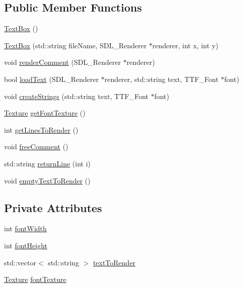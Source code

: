 \subsection*{Public Member Functions}
\begin{DoxyCompactItemize}
\item 
\hyperlink{class_text_box_a25b67e5ff6788c60b8aef3f3540879d0}{Text\+Box} ()
\item 
\hyperlink{class_text_box_a7e80f260cc97085b70e838f0f4250697}{Text\+Box} (std\+::string file\+Name, S\+D\+L\+\_\+\+Renderer $\ast$renderer, int x, int y)
\item 
void \hyperlink{class_text_box_a8746fe595a510ea6c3dc9908b448802c}{render\+Comment} (S\+D\+L\+\_\+\+Renderer $\ast$renderer)
\item 
bool \hyperlink{class_text_box_add2f877e6715744908d5eb0c9c53e5a9}{load\+Text} (S\+D\+L\+\_\+\+Renderer $\ast$renderer, std\+::string text, T\+T\+F\+\_\+\+Font $\ast$font)
\item 
void \hyperlink{class_text_box_a19cb5e85c864060ecdb2fe2bab6fd54d}{create\+Strings} (std\+::string text, T\+T\+F\+\_\+\+Font $\ast$font)
\item 
\hyperlink{class_texture}{Texture} \hyperlink{class_text_box_a47653c059e6074242066423bad187fb6}{get\+Font\+Texture} ()
\item 
int \hyperlink{class_text_box_a7c620113713b6b841ef7e183c1d81312}{get\+Lines\+To\+Render} ()
\item 
void \hyperlink{class_text_box_a6ab09c23671be63b41bd0eba32d385e3}{free\+Comment} ()
\item 
std\+::string \hyperlink{class_text_box_ac10a24236f968ae36705f8bf300dfd79}{return\+Line} (int i)
\item 
void \hyperlink{class_text_box_a3c57ce309c31e346dbc504b5e23d7ebc}{empty\+Text\+To\+Render} ()
\end{DoxyCompactItemize}
\subsection*{Private Attributes}
\begin{DoxyCompactItemize}
\item 
int \hyperlink{class_text_box_a55045d04b5804c912bd9be29bc8478b9}{font\+Width}
\item 
int \hyperlink{class_text_box_a55689185cc0627e45b0d70304eb962d2}{font\+Height}
\item 
std\+::vector$<$ std\+::string $>$ \hyperlink{class_text_box_a13ec32aabf23db2253af70f19a2bf1e9}{text\+To\+Render}
\item 
\hyperlink{class_texture}{Texture} \hyperlink{class_text_box_a94e1863fccbb2e8de3547aa89b8e85f0}{font\+Texture}
\end{DoxyCompactItemize}



